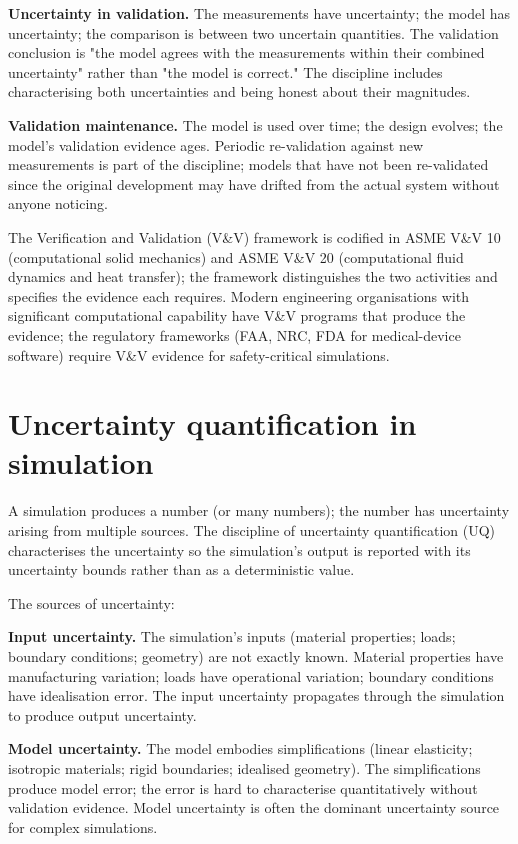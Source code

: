 \textbf{Uncertainty in validation.} The measurements have uncertainty; the model has uncertainty; the comparison is between two uncertain quantities. The validation conclusion is "the model agrees with the measurements within their combined uncertainty" rather than "the model is correct." The discipline includes characterising both uncertainties and being honest about their magnitudes.

\textbf{Validation maintenance.} The model is used over time; the design evolves; the model's validation evidence ages. Periodic re-validation against new measurements is part of the discipline; models that have not been re-validated since the original development may have drifted from the actual system without anyone noticing.

The Verification and Validation (V\&V) framework is codified in ASME V\&V 10 (computational solid mechanics) and ASME V\&V 20 (computational fluid dynamics and heat transfer); the framework distinguishes the two activities and specifies the evidence each requires. Modern engineering organisations with significant computational capability have V\&V programs that produce the evidence; the regulatory frameworks (FAA, NRC, FDA for medical-device software) require V\&V evidence for safety-critical simulations.

\section{Uncertainty quantification in simulation}

A simulation produces a number (or many numbers); the number has uncertainty arising from multiple sources. The discipline of uncertainty quantification (UQ) characterises the uncertainty so the simulation's output is reported with its uncertainty bounds rather than as a deterministic value.

The sources of uncertainty:

\textbf{Input uncertainty.} The simulation's inputs (material properties; loads; boundary conditions; geometry) are not exactly known. Material properties have manufacturing variation; loads have operational variation; boundary conditions have idealisation error. The input uncertainty propagates through the simulation to produce output uncertainty.

\textbf{Model uncertainty.} The model embodies simplifications (linear elasticity; isotropic materials; rigid boundaries; idealised geometry). The simplifications produce model error; the error is hard to characterise quantitatively without validation evidence. Model uncertainty is often the dominant uncertainty source for complex simulations.

